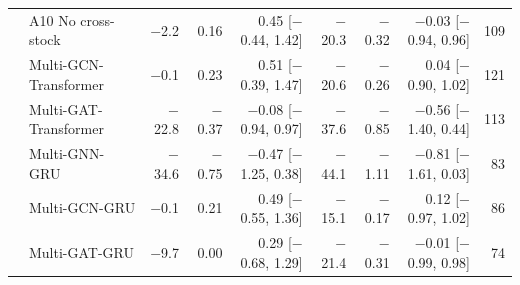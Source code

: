 \begin{table}[!t]
{\begin{tabular}{llrrrrrrr}
 & A10 No cross-stock & $-$2.2 & 0.16 & 0.45 [$-$0.44, 1.42] & $-$20.3 & $-$0.32 & $-$0.03 [$-$0.94, 0.96] & 109 \\
 & Multi-GCN-Transformer & $-$0.1 & 0.23 & 0.51 [$-$0.39, 1.47] & $-$20.6 & $-$0.26 & 0.04 [$-$0.90, 1.02] & 121 \\
 & Multi-GAT-Transformer & $-$22.8 & $-$0.37 & $-$0.08 [$-$0.94, 0.97] & $-$37.6 & $-$0.85 & $-$0.56 [$-$1.40, 0.44] & 113 \\
 & Multi-GNN-GRU & $-$34.6 & $-$0.75 & $-$0.47 [$-$1.25, 0.38] & $-$44.1 & $-$1.11 & $-$0.81 [$-$1.61, 0.03] & 83 \\
 & Multi-GCN-GRU & $-$0.1 & 0.21 & 0.49 [$-$0.55, 1.36] & $-$15.1 & $-$0.17 & 0.12 [$-$0.97, 1.02] & 86 \\
 & Multi-GAT-GRU & $-$9.7 & 0.00 & 0.29 [$-$0.68, 1.29] & $-$21.4 & $-$0.31 & $-$0.01 [$-$0.99, 0.98] & 74 \\
\bottomrule
\end{tabular}}\end{table}